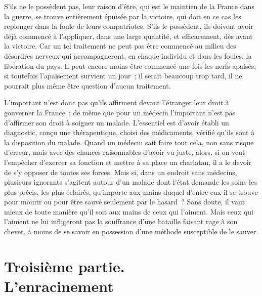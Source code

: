 \documentclass[french,twoside]{book} %
\begin{document}
S'ils ne le possèdent pas, leur raison d'être, qui est le maintien de la France dans la guerre, se trouve entièrement épuisée par la victoire, qui doit en ce cas les replonger dans la foule de leurs compatriotes. S'ils le possèdent, ils doivent avoir déjà commencé à l'appliquer, dans une large quantité, et efficacement, dès avant la victoire. Car un tel traitement ne peut pas être commencé au milieu des désordres nerveux qui accompagneront, en chaque individu et dans les foules, la libération du pays. Il peut encore moins être commencé une fois les nerfs apaisés, si toutefois l'apaisement survient un jour ; il serait beaucoup trop tard, il ne pourrait plus même être question d'aucun traitement.\par
L'important n'est donc pas qu'ils affirment devant l'étranger leur droit à gouverner la France ; de même que pour un médecin l'important n'est pas d'affirmer son droit à soigner un malade. L'essentiel est d'avoir établi un diagnostic, conçu une thérapeutique, choisi des médicaments, vérifié qu'ils sont à la disposition du malade. Quand un médecin sait faire tout cela, non sans risque d'erreur, mais avec des chances raisonnables d'avoir vu juste, alors, si on veut l'empêcher d'exercer sa fonction et mettre à sa place un charlatan, il a le devoir de s'y opposer de toutes ses forces. Mais si, dans un endroit sans médecins, plusieurs ignorants s'agitent autour d'un malade dont l'état demande les soins les plus précis, les plus éclairés, qu'importe aux mains duquel d'entre eux il se trouve pour mourir ou pour être sauvé seulement par le hasard ? Sans doute, il vaut mieux de toute manière qu'il soit aux mains de ceux qui l'aiment. Mais ceux qui l'aiment ne lui infligeront pas la souffrance d'une bataille faisant rage à son chevet, à moins de se savoir en possession d'une méthode susceptible de le sauver.
\section[Troisième partie. L’enracinement]{Troisième partie. \\
L’enracinement}\renewcommand{\leftmark}{Troisième partie. \\
L’enracinement}
\end{document}
